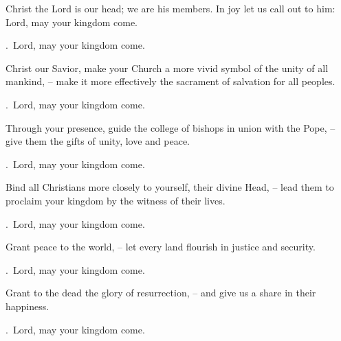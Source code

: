 \lettrine[loversize=0.15,lines=2]{C}{}hrist the Lord is our head; we are his members. In joy let us call out to him: Lord, may your kingdom come.
\par \Rbar.~Lord, may your kingdom come.

Christ our Savior, make your Church a more vivid symbol of the unity of all mankind, – make it more effectively the sacrament of salvation for all peoples. \par \Rbar.~Lord, may your kingdom come.

Through your presence, guide the college of bishops in union with the Pope, – give them the gifts of unity, love and peace. \par \Rbar.~Lord, may your kingdom come.

Bind all Christians more closely to yourself, their divine Head, – lead them to proclaim your kingdom by the witness of their lives. \par \Rbar.~Lord, may your kingdom come.

Grant peace to the world, – let every land flourish in justice and security. \par \Rbar.~Lord, may your kingdom come.

Grant to the dead the glory of resurrection, – and give us a share in their happiness. \par \Rbar.~Lord, may your kingdom come.
